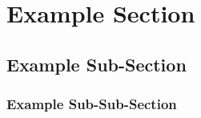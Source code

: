 \documentclass[template=aiaa-journal]{nasa-latex-docs}
\begin{document}
\section{Example Section}

\lipsum[1]

\subsection{Example Sub-Section}

\lipsum[1-2]

\subsubsection{Example Sub-Sub-Section}

\lipsum[1]
\end{document}
